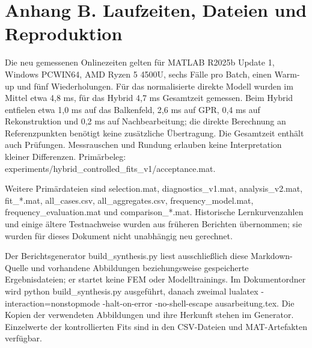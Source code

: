 \documentclass[11pt,a4paper]{article}
\begin{document}
\section{Anhang B. Laufzeiten, Dateien und Reproduktion}
Die neu gemessenen Onlinezeiten gelten für MATLAB R2025b Update 1, Windows PCWIN64, AMD Ryzen 5 4500U, sechs Fälle pro Batch, einen Warm-up und fünf Wiederholungen. Für das normalisierte direkte Modell wurden im Mittel etwa 4,8 ms, für das Hybrid 4,7 ms Gesamtzeit gemessen. Beim Hybrid entfielen etwa 1,0 ms auf das Balkenfeld, 2,6 ms auf GPR, 0,4 ms auf Rekonstruktion und 0,2 ms auf Nachbearbeitung; die direkte Berechnung an Referenzpunkten benötigt keine zusätzliche Übertragung. Die Gesamtzeit enthält auch Prüfungen. Messrauschen und Rundung erlauben keine Interpretation kleiner Differenzen. Primärbeleg: experiments/hybrid\_\allowbreak{}controlled\_\allowbreak{}fits\_\allowbreak{}v1/acceptance.mat.

Weitere Primärdateien sind selection.mat, diagnostics\_\allowbreak{}v1.mat, analysis\_\allowbreak{}v2.mat, fit\_\allowbreak{}*.mat, all\_\allowbreak{}cases.csv, all\_\allowbreak{}aggregates.csv, frequency\_\allowbreak{}model.mat, frequency\_\allowbreak{}evaluation.mat und comparison\_\allowbreak{}*.mat. Historische Lernkurvenzahlen und einige ältere Testnachweise wurden aus früheren Berichten übernommen; sie wurden für dieses Dokument nicht unabhängig neu gerechnet.

Der Berichtsgenerator build\_\allowbreak{}synthesis.py liest ausschließlich diese Markdown-Quelle und vorhandene Abbildungen beziehungsweise gespeicherte Ergebnisdateien; er startet keine FEM oder Modelltrainings. Im Dokumentordner wird python build\_\allowbreak{}synthesis.py ausgeführt, danach zweimal lualatex -interaction=nonstopmode -halt-on-error -no-shell-escape ausarbeitung.tex. Die Kopien der verwendeten Abbildungen und ihre Herkunft stehen im Generator. Einzelwerte der kontrollierten Fits sind in den CSV-Dateien und MAT-Artefakten verfügbar.
\end{document}
